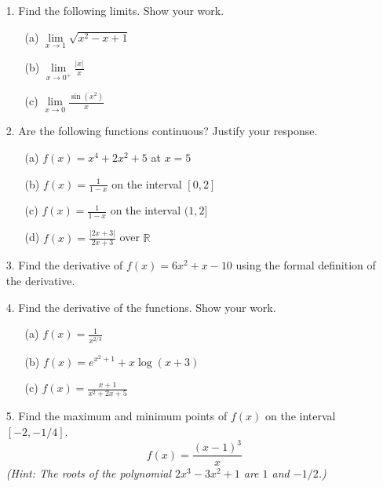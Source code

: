 \documentclass[12pt, amssymb, one column]{article}
\begin{document}
\begin{itemize}
	\item[1.] Find the following limits. Show your work.
		\begin{itemize}
			\item[(a)]$\lim\limits_{x\to1}\sqrt{x^2-x+1}$
			\item[(b)]$\lim\limits_{x\to 0^+}\frac{|x|}{x}$
			\item[(c)]$\lim\limits_{x\to 0}\frac{\sin(x^2)}{x}$
		\end{itemize}

	\item[2.] Are the following functions continuous? Justify your response.
		\begin{itemize}
			\item[(a)] $f(x)=x^4+2x^2+5$ at $x=5$
			\item[(b)] $f(x)=\frac{1}{1-x}$ on the interval $[0,2]$
			\item[(c)] $f(x)=\frac{1}{1-x}$ on the interval $(1,2]$
			\item[(d)] $f(x)=\frac{|2x+3|}{2x+3}$ over $\mathbb{R}$
		\end{itemize}

	\item[3.] Find the derivative of $f(x)=6x^2+x-10$ using the formal definition of the derivative.

	\item[4.] Find the derivative of the functions. Show your work.
		\begin{itemize}
			\item[(a)]$f(x)=\frac{1}{x^{2/3}}$
			\item[(b)]$f(x) = e^{x^2+1} + x\log(x+3)$
			\item[(c)]$f(x) = \frac{x+1}{x^2+2x+5}$
		\end{itemize}
	
	\item[5.] Find the maximum and minimum points of $f(x)$ on the interval $[-2,-1/4]$.
		$$f(x) = \frac{(x-1)^3}{x}$$
		\textit{(Hint: The roots of the polynomial $2x^3-3x^2+1$ are $1$ and $-1/2$.)}
	
\end{itemize}
\end{document}
